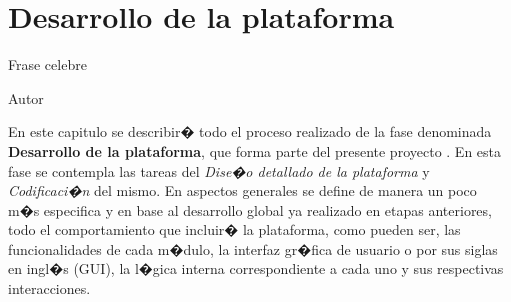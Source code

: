 %
%
%
%
%
%
%
%
%
%

\chapter{Desarrollo de la plataforma}
\label{cap3:desarrollo}

\begin{FraseCelebre}
\begin{Frase}
Frase celebre
\end{Frase}
\begin{Fuente}
Autor
\end{Fuente}
\end{FraseCelebre}

\begin{resumen}
	En este capitulo se describir� todo el proceso realizado de la fase denominada \textbf{Desarrollo de la plataforma}, que forma parte del presente proyecto . En esta fase se contempla las tareas del \textit{Dise�o detallado de la plataforma} y \textit{Codificaci�n} del mismo. En aspectos generales se define de manera un poco m�s especifica y en base al desarrollo global ya realizado en etapas anteriores, todo el comportamiento que incluir� la plataforma, como pueden ser, las funcionalidades de cada m�dulo, la interfaz gr�fica de usuario o por sus siglas en ingl�s (GUI), la l�gica interna correspondiente a cada uno y sus respectivas interacciones. 
\end{resumen}


